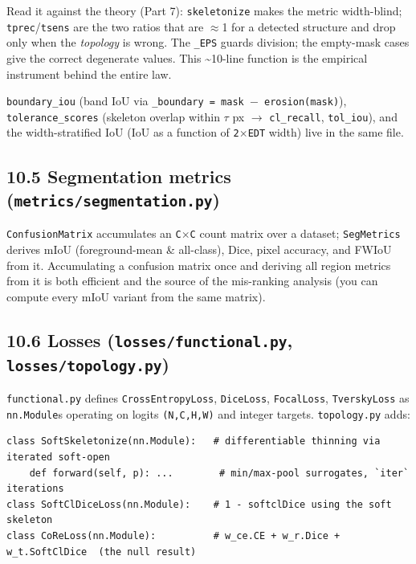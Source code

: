 \documentclass[11pt]{article}
\begin{document}
Read it against the theory (Part 7): \texttt{skeletonize} makes the metric width-blind; \texttt{tprec}/\texttt{tsens} are the two ratios that are $\approx$1 for a detected structure and drop only when the \textit{topology} is wrong. The \texttt{\_EPS} guards division; the empty-mask cases give the correct degenerate values. This \textasciitilde{}10-line function is the empirical instrument behind the entire law.

\texttt{boundary\_iou} (band IoU via \texttt{\_boundary = mask $-$ erosion(mask)}), \texttt{tolerance\_scores} (skeleton overlap within \texttt{$\tau$} px $\rightarrow$ \texttt{cl\_recall}, \texttt{tol\_iou}), and the width-stratified IoU (IoU as a function of \texttt{2$\times$EDT} width) live in the same file.

\subsection*{10.5 Segmentation metrics (\texttt{metrics/segmentation.py})}

\texttt{ConfusionMatrix} accumulates an \texttt{C$\times$C} count matrix over a dataset; \texttt{SegMetrics} derives mIoU (foreground-mean \& all-class), Dice, pixel accuracy, and FWIoU from it. Accumulating a confusion matrix once and deriving all region metrics from it is both efficient and the source of the mis-ranking analysis (you can compute every mIoU variant from the same matrix).

\subsection*{10.6 Losses (\texttt{losses/functional.py}, \texttt{losses/topology.py})}

\texttt{functional.py} defines \texttt{CrossEntropyLoss}, \texttt{DiceLoss}, \texttt{FocalLoss}, \texttt{TverskyLoss} as \texttt{nn.Module}s operating on logits \texttt{(N,C,H,W)} and integer targets. \texttt{topology.py} adds:

\begin{Verbatim}[breaklines=true,breakanywhere=true,fontsize=\footnotesize]
class SoftSkeletonize(nn.Module):   # differentiable thinning via iterated soft-open
    def forward(self, p): ...        # min/max-pool surrogates, `iter` iterations
class SoftClDiceLoss(nn.Module):    # 1 - softclDice using the soft skeleton
class CoReLoss(nn.Module):          # w_ce.CE + w_r.Dice + w_t.SoftClDice  (the null result)
\end{Verbatim}
\end{document}
